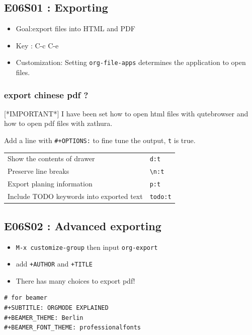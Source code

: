 \documentclass[11pt]{article}
\begin{document}
\subsection{E06S01 : Exporting}
\label{sec:org986bd77}
\begin{itemize}
\item Goal:export files into HTML and PDF
\item Key : C-c C-e
\item Customization: Setting \texttt{org-file-apps} determines the application to open files.
\end{itemize}

\subsubsection{export chinese pdf ?}
\label{sec:org00a3ef3}
[*IMPORTANT*] I have been set how to open html files with qutebrowser and how
to open pdf files with zathura.

Add a line with \texttt{\#+OPTIONS:} to fine tune the output, \texttt{t} is true.
\begin{center}
\begin{tabular}{ll}
Show the contents of drawer & \texttt{d:t}\\
Preserve line breaks & \texttt{\textbackslash{}n:t}\\
Export planing information & \texttt{p:t}\\
Include TODO keywords into exported text & \texttt{todo:t}\\
\end{tabular}
\end{center}

\subsection{E06S02 : Advanced exporting}
\label{sec:orgd157e19}
\begin{itemize}
\item \texttt{M-x customize-group} then input  \texttt{org-export}
\item add \texttt{+AUTHOR} and \texttt{+TITLE}
\item There has many choices to export pdf!
\end{itemize}

\begin{verbatim}
# for beamer
#+SUBTITLE: ORGMODE EXPLAINED
#+BEAMER_THEME: Berlin
#+BEAMER_FONT_THEME: professionalfonts
\end{verbatim}
\end{document}
